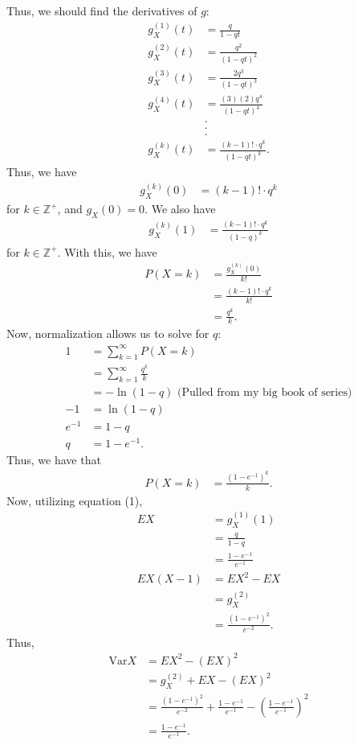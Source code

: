 \documentclass[10pt,a4paper]{article}
\theoremstyle{theorem}
\theoremstyle{definition}
\begin{document}
Thus, we should find the derivatives of $g$:
\begin{align*}
g_{X}^{(1)}(t) &= \frac{q}{1 - qt}\\
g_{X}^{(2)}(t) &= \frac{q^2}{(1 - qt)^2}\\
g_{X}^{(3)}(t) &= \frac{2q^3}{(1 - qt)^3}\\
g_{X}^{(4)}(t) &= \frac{(3)(2)q^4}{(1 - qt)^4}\\
&.\\
&.\\
&.\\
g_{X}^{(k)}(t) &= \frac{(k-1)! \cdot q^k}{(1 - qt)^k}.
\end{align*}
Thus, we have
\begin{align*}
g_{X}^{(k)}(0) &= (k-1)! \cdot q^k
\end{align*}
for $k \in \mathbb{Z}^+$, and $g_X(0) = 0$.
We also have
\begin{align*}
g_{X}^{(k)}(1) &= \frac{(k-1)! \cdot q^k}{(1 - q)^k}
\end{align*}
for $k \in \mathbb{Z}^+$. With this, we have
\begin{align*}
P(X=k) &= \frac{g_{X}^{(k)}(0)}{k!}\\
&=  \frac{(k-1)! \cdot q^k}{k!}\\
&= \frac{q^k}{k}.
\end{align*}
Now, normalization allows us to solve for $q$:
\begin{align*}
1 &= \sum_{k=1}^\infty P(X = k)\\
&= \sum_{k=1}^\infty \frac{q^k}{k}\\
&= -\ln(1 - q) \text{ (Pulled from my big book of series)}\\
-1 &= \ln(1 - q)\\
e^{-1} &= 1 - q\\
q &= 1 - e^{-1}.
\end{align*}
Thus, we have that 
\begin{align*}
P(X = k) &= \boxed{\frac{(1 - e^{-1})^k}{k}}.
\end{align*}
Now, utilizing equation (1),
\begin{align*}
EX &= g_{X}^{(1)}(1)\\
&= \frac{q}{1 - q}\\
&= \boxed{\frac{1 - e^{-1}}{e^{-1}}}\\
EX(X-1) &= EX^2 - EX\\
&= g_X^{(2)}\\
&= \frac{(1 - e^{-1})^2}{e^{-2}}.
\end{align*}
Thus,
\begin{align*}
\text{Var}X &= EX^2 - (EX)^2\\
&= g_X^{(2)} + EX - (EX)^2\\
&= \frac{(1 - e^{-1})^2}{e^{-2}} + \frac{1 - e^{-1}}{e^{-1}} - \left( \frac{1 - e^{-1}}{e^{-1}} \right)^2\\
&=\boxed{\frac{1 - e^{-1}}{e^{-1}}}.
\end{align*}
\end{document}
